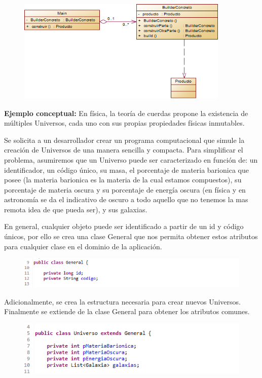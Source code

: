 \begin{figure}[H]
	\includegraphics[width=0.9\textwidth]{images/creational/builder/builder.png}
\end{figure}

\textbf{Ejemplo conceptual:} En física, la teoría de cuerdas propone la existencia de múltiples Universos, cada uno con sus propias propiedades físicas inmutables.

Se solicita a un desarrollador crear un programa computacional que simule la creación de Universos de una manera sencilla y compacta. Para simplificar el problema, asumiremos que un Universo puede ser caracterizado en función de: un identificador, un código único, su masa, el porcentaje de materia barionica que posee (la materia barionica es la materia de la cual estamos compuestos), su porcentaje de materia oscura y su porcentaje de energía oscura (en física y en astronomía se da el indicativo de oscuro a todo aquello que no tenemos la mas remota idea de que pueda ser), y sus galaxias.

En general, cualquier objeto puede ser identificado a partir de un id y código únicos, por ello se crea una clase General que nos permita obtener estos atributos para cualquier clase en el dominio de la aplicación.

\begin{figure}[H]
	\includegraphics{images/creational/builder/builderExample1.png}
\end{figure}

Adicionalmente, se crea la estructura necesaria para crear nuevos Universos. Finalmente se extiende de la clase General para obtener los atributos comunes.

\begin{figure}[H]
	\includegraphics{images/creational/builder/builderExample2.png}
\end{figure}

